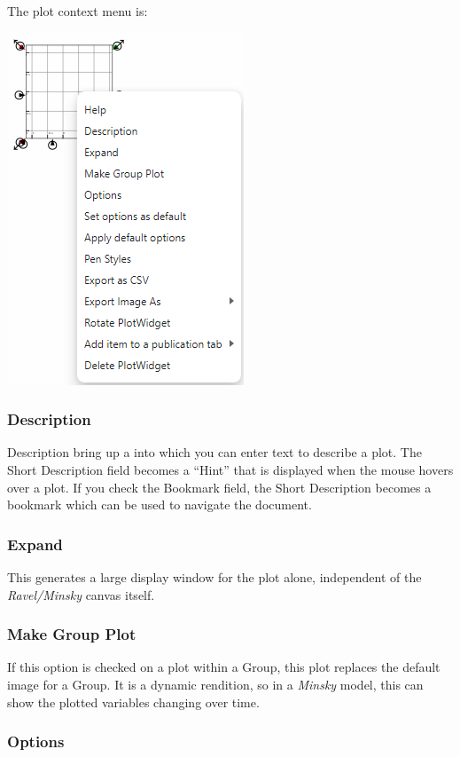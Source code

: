 The plot context menu is:

\includegraphics{images/PlotContextMenu}

\subsubsection{Description}

Description bring up a  into which you can
enter text to describe a plot. The Short Description field becomes
a ``Hint'' that is displayed when the mouse hovers over a plot.
If you check the Bookmark field, the Short Description becomes a bookmark
which can be used to navigate the document.

\subsubsection{Expand}

This generates a large display window for the plot alone, independent
of the \emph{Ravel/Minsky} canvas itself.

\subsubsection{Make Group Plot}

If this option is checked on a plot within a Group, this plot replaces
the default image for a Group. It is a dynamic rendition, so in a
\emph{Minsky} model, this can show the plotted variables changing
over time.

\subsubsection{Options}

